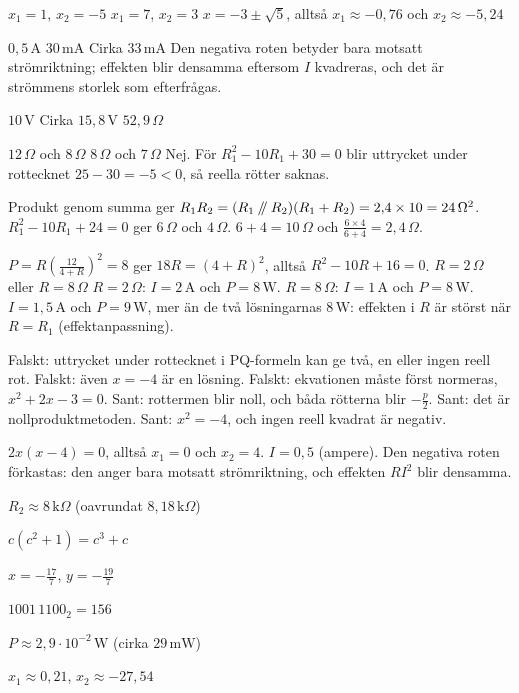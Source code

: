 \begin{facit}
  $x_1 = 1$, $x_2 = -5$  $x_1 = 7$, $x_2 = 3$
 $x = -3 \pm \sqrt{5}$, alltså $x_1 \approx -0{,}76$ och $x_2 \approx -5{,}24$

  $0{,}5\,\text{A}$  $30\,\text{mA}$  Cirka $33\,\text{mA}$
 Den negativa roten betyder bara motsatt strömriktning; effekten blir densamma eftersom $I$
kvadreras, och det är strömmens storlek som efterfrågas.

  $10\,\text{V}$  Cirka $15{,}8\,\text{V}$  $52{,}9\,\Omega$

  $12\,\Omega$ och $8\,\Omega$  $8\,\Omega$ och $7\,\Omega$
 Nej. För $R_1^2 - 10R_1 + 30 = 0$ blir uttrycket under rottecknet $25 - 30 = -5 < 0$,
så reella rötter saknas.

  Produkt genom summa ger $R_1 R_2 = (R_1 \mathbin{/\mkern-5mu/} R_2)(R_1 + R_2)
= 2{,}4 \times 10 = 24\,\Omega^2$.
 $R_1^2 - 10R_1 + 24 = 0$ ger $6\,\Omega$ och $4\,\Omega$.
 $6 + 4 = 10\,\Omega$ och $\frac{6 \times 4}{6 + 4} = 2{,}4\,\Omega$.

  $P = R\left(\frac{12}{4 + R}\right)^2 = 8$ ger $18R = (4 + R)^2$, alltså
$R^2 - 10R + 16 = 0$.
 $R = 2\,\Omega$ eller $R = 8\,\Omega$
 $R = 2\,\Omega$: $I = 2\,\text{A}$ och $P = 8\,\text{W}$. $R = 8\,\Omega$: $I = 1\,\text{A}$
och $P = 8\,\text{W}$.
 $I = 1{,}5\,\text{A}$ och $P = 9\,\text{W}$, mer än de två lösningarnas $8\,\text{W}$:
effekten i $R$ är störst när $R = R_1$ (effektanpassning).

  Falskt: uttrycket under rottecknet i PQ-formeln kan ge två, en eller ingen
reell rot.
 Falskt: även $x = -4$ är en lösning.
 Falskt: ekvationen måste först normeras, $x^2 + 2x - 3 = 0$.
 Sant: rottermen blir noll, och båda rötterna blir $-\frac{p}{2}$.
 Sant: det är nollproduktmetoden.
 Sant: $x^2 = -4$, och ingen reell kvadrat är negativ.

  $2x(x - 4) = 0$, alltså $x_1 = 0$ och $x_2 = 4$.
 $I = 0{,}5$ (ampere). Den negativa roten förkastas: den anger bara motsatt strömriktning,
och effekten $RI^2$ blir densamma.

\end{facit}

\begin{facit}

 $R_2 \approx 8\,\text{k}\Omega$ (oavrundat $8{,}18\,\text{k}\Omega$)

 $c(c^2 + 1) = c^3 + c$

 $x = -\frac{17}{7}$, $y = -\frac{19}{7}$

 $1001\,1100_2 = 156$

 $P \approx 2{,}9 \cdot 10^{-2}\,\text{W}$ (cirka $29\,\text{mW}$)

 $x_1 \approx 0{,}21$, $x_2 \approx -27{,}54$

\end{facit}
